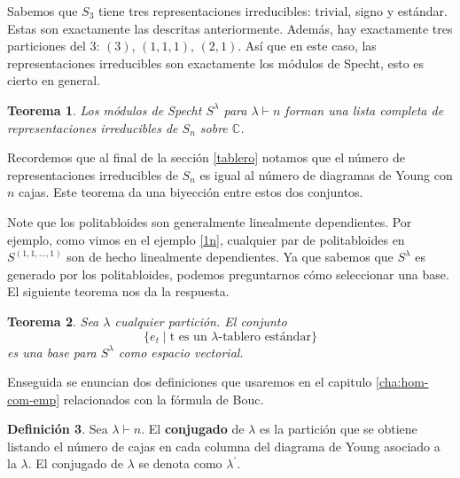 \documentclass[12pt]{book}
\newtheorem{theorem}{Teorema}[section]
\newtheorem{corollary}[theorem]{Corolario}
\theoremstyle{definition}
\newtheorem{definition}[theorem]{Definición}
\newcounter{in}
\newcounter{ini}
\begin{document}
Sabemos que $S_{3}$ tiene tres representaciones irreducibles: trivial,
signo y estándar. Estas son exactamente las descritas anteriormente. Además,
hay exactamente tres particiones del $3$: $(3)$, $(1,1,1)$,
$(2,1)$. Así que en este caso, las representaciones irreducibles son
exactamente los módulos de Specht, esto es cierto en general.

\begin{theorem}
  Los módulos de Specht $S^{\lambda}$ para $\lambda\vdash n$ forman
  una lista completa de representaciones irreducibles de $S_{n}$ sobre
  $\mathbb{C}$.
  \label{todas-repr-irre}
\end{theorem}

Recordemos que al final de la sección \ref{tablero} notamos que el
número de representaciones irreducibles de $S_{n}$ es igual al número
de diagramas de Young con $n$ cajas. Este teorema da una biyección
entre estos dos conjuntos.

Note que los politabloides son generalmente linealmente dependientes. Por
ejemplo, como vimos en el ejemplo \ref{1n}, cualquier par de
politabloides en $S^{(1,1,\ldots,1)}$ son de hecho linealmente
dependientes. Ya que sabemos que $S^{\lambda}$ es generado por los
politabloides, podemos preguntarnos cómo seleccionar una base. El
siguiente teorema nos da la respuesta.

\begin{theorem}
  \label{base-S}
  Sea $\lambda$ cualquier partición. El conjunto
  \begin{equation*}
    \{e_{t}\mid \mbox{t es un $\lambda$-tablero estándar}\}
  \end{equation*}
  es una base para $S^{\lambda}$ como espacio vectorial.
\end{theorem}

Enseguida se enuncian dos definiciones que usaremos en el capitulo \ref{cha:hom-com-emp}
relacionados con la fórmula de Bouc.
\begin{definition}
  Sea $\lambda\vdash n$. El \textbf{conjugado} de $\lambda$ es la
  partición que se obtiene listando el número de cajas en cada columna
  del diagrama de Young asociado a la $\lambda$. El conjugado de
  $\lambda$ se denota como $\lambda^{'}$. 
\end{definition}
\end{document}
